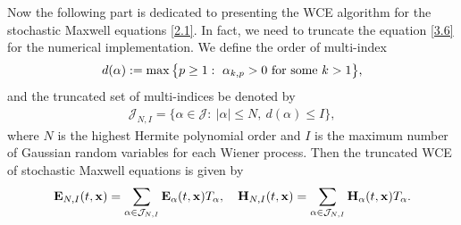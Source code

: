 \documentclass[preprint,12pt]{article}
\numberwithin{figure}{section}
\numberwithin{table}{section}
\numberwithin{equation}{section}
\begin{document}
Now the following part is dedicated to presenting the WCE algorithm for the stochastic Maxwell equations \eqref{2.1}. In fact, we need to truncate the equation \eqref{3.6} for the numerical implementation. We define the order of multi-index 
$$d(\alpha):=\max\big\{p\geq1:~\alpha_{k,p}>0~{\rm for ~some}~k>1\big\},$$
and the truncated set of multi-indices be denoted by
\begin{align*}
	\mathcal{J}_{N,I}=\big\{\alpha\in\mathcal{J}:~|\alpha|\leq N,~d(\alpha)\leq I\big\},
\end{align*}
where $N$ is the highest Hermite polynomial order and $I$ is the maximum number of Gaussian random variables for each Wiener process. Then the truncated WCE of stochastic Maxwell equations is given by
\begin{equation}\label{WCE_trun}
	{\bf E}_{N,I}(t,{\bf x})=\sum_{\alpha\in\mathcal{J}_{N,I}}{\bf E}_{\alpha}(t,{\bf x})T_{\alpha},\quad {\bf H}_{N,I}(t,{\bf x})=\sum_{\alpha\in\mathcal{J}_{N,I}}{\bf H}_{\alpha}(t,{\bf x})T_{\alpha}.
\end{equation}
\end{document}
